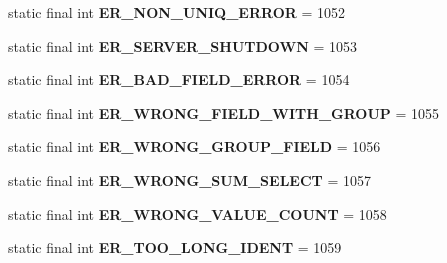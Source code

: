 \begin{DoxyCompactItemize}
static final int {\bfseries E\+R\+\_\+\+N\+O\+N\+\_\+\+U\+N\+I\+Q\+\_\+\+E\+R\+R\+OR} = 1052
\item 
\mbox{\label{classcom_1_1mysql_1_1jdbc_1_1_mysql_error_numbers_a3a32cbaa115be001632c2366d04a321d}} 
static final int {\bfseries E\+R\+\_\+\+S\+E\+R\+V\+E\+R\+\_\+\+S\+H\+U\+T\+D\+O\+WN} = 1053
\item 
\mbox{\label{classcom_1_1mysql_1_1jdbc_1_1_mysql_error_numbers_a83efa5636e73b65349933c07f5c622b4}} 
static final int {\bfseries E\+R\+\_\+\+B\+A\+D\+\_\+\+F\+I\+E\+L\+D\+\_\+\+E\+R\+R\+OR} = 1054
\item 
\mbox{\label{classcom_1_1mysql_1_1jdbc_1_1_mysql_error_numbers_ac27cea7916a978b9b6b77be3a81a120a}} 
static final int {\bfseries E\+R\+\_\+\+W\+R\+O\+N\+G\+\_\+\+F\+I\+E\+L\+D\+\_\+\+W\+I\+T\+H\+\_\+\+G\+R\+O\+UP} = 1055
\item 
\mbox{\label{classcom_1_1mysql_1_1jdbc_1_1_mysql_error_numbers_a35bc223a0ca9d8e9f810d5e4e28374cc}} 
static final int {\bfseries E\+R\+\_\+\+W\+R\+O\+N\+G\+\_\+\+G\+R\+O\+U\+P\+\_\+\+F\+I\+E\+LD} = 1056
\item 
\mbox{\label{classcom_1_1mysql_1_1jdbc_1_1_mysql_error_numbers_a433b809577e3393a124e1a4fc0f6ecf7}} 
static final int {\bfseries E\+R\+\_\+\+W\+R\+O\+N\+G\+\_\+\+S\+U\+M\+\_\+\+S\+E\+L\+E\+CT} = 1057
\item 
\mbox{\label{classcom_1_1mysql_1_1jdbc_1_1_mysql_error_numbers_a7aae4c4cdedb335fb7ff54a9f888ae87}} 
static final int {\bfseries E\+R\+\_\+\+W\+R\+O\+N\+G\+\_\+\+V\+A\+L\+U\+E\+\_\+\+C\+O\+U\+NT} = 1058
\item 
\mbox{\label{classcom_1_1mysql_1_1jdbc_1_1_mysql_error_numbers_ab8e8836c0eec503828d05f5e64babfd4}} 
static final int {\bfseries E\+R\+\_\+\+T\+O\+O\+\_\+\+L\+O\+N\+G\+\_\+\+I\+D\+E\+NT} = 1059
\item 
\mbox{\label{classcom_1_1mysql_1_1jdbc_1_1_mysql_error_numbers_a9839c2806bac72b6fb4f7cf979a6aa28}} 

\end{DoxyCompactItemize}
